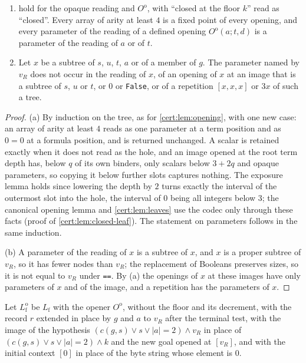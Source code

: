 \begin{lemma}\label{cert:lem:opaque}
\begin{enumerate}[label=(\alph*)]
\item {} hold for the
opaque reading and $O^{\mathrm o}$, with ``closed at the floor $k$'' read as ``closed''. Every
array of arity at least $4$ is a fixed point of every opening, and every parameter of the
reading of a defined opening $O^{\mathrm o}(a;t,d)$ is a parameter of the reading of $a$ or of
$t$.
\item Let $x$ be a subtree of $s$, $u$, $t$, $a$ or of a member of $g$. The parameter named by
$v_R$ does not occur in the reading of $x$, of an opening of $x$ at an image that is a subtree of
$s$, $u$ or $t$, or $0$ or \texttt{False}, or of a repetition $[x,x,x]$ or $3x$ of such a tree.
\end{enumerate}
\end{lemma}
\begin{proof}
(a) By induction on the tree, as for \cref{cert:lem:opening}, with one new case: an array of
arity at least $4$ reads as one parameter at a term position and as $0=0$ at a formula position,
and is returned unchanged. A scalar is retained exactly when it does not read as the hole, and an
image opened at the root term depth has, below $q$ of its own binders, only scalars below $3+2q$
and opaque parameters, so copying it below further slots captures nothing. The exposure lemma
holds since lowering the depth by $2$ turns exactly the interval of the outermost slot into the
hole, the interval of $0$ being all integers below $3$; the canonical opening lemma and
\cref{cert:lem:leaves} use the codec only through these facts (proof of
\cref{cert:lem:closed-leaf}). The statement on parameters follows in the same induction.

(b) A parameter of the reading of $x$ is a subtree of $x$, and $x$ is a proper subtree of
$v_R$, so it has fewer nodes than $v_R$; the replacement of Booleans preserves sizes, so it is not
equal to $v_R$ under \texttt{==}. By (a) the openings of $x$ at these images have only parameters
of $x$ and of the image, and a repetition has the parameters of $x$.
\end{proof}

Let $L^{\mathrm o}_{\mathrm f}$ be $L_{\mathrm f}$ with the opener $O^{\mathrm o}$, without the floor
and its decrement, with the record $r$ extended in place by $g$ and $a$ to $v_R$ after the
terminal test, with the image of the hypothesis $(c(g,s)\lor s\lor\lvert a\rvert=2)\land v_R$ in
place of $(c(g,s)\lor s\lor\lvert a\rvert=2)\land k$ and the new goal opened at $[v_R]$, and with
the initial context $[0]$ in place of the byte string whose element is $0$.

